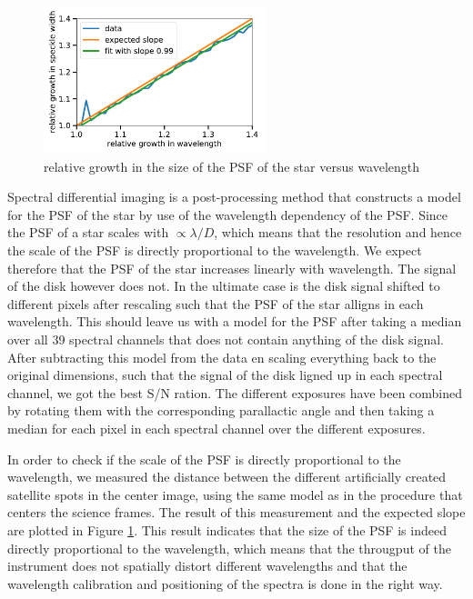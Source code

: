 \documentclass[twoside,single]{lion-msc}
\begin{document}
\begin{figure}
\centering
\includegraphics[width = 0.57\textwidth]{specklegrowth}
\caption{relative growth in the size of the PSF of the star versus wavelength}
\label{fig:specklegrowth}
\end{figure}
Spectral differential imaging is a post-processing method that constructs a model for the PSF of the star by use of the wavelength dependency of the PSF. Since the PSF of a star scales with $ \propto\lambda/D$, which means that the resolution and hence the scale of the PSF is directly proportional to the wavelength. We expect therefore that the PSF of the star increases linearly with wavelength. The signal of the disk however does not. In the ultimate case is the disk signal shifted to different pixels after rescaling such that the PSF of the star alligns in each wavelength. This should leave us with a model for the PSF after taking a median over all 39 spectral channels that does not contain anything of the disk signal. After subtracting this model from the data en scaling everything back to the original dimensions, such that the signal of the disk ligned up in each spectral channel, we got the best S/N ration. The different exposures have been combined by rotating them with the corresponding parallactic angle and then taking a median for each pixel in each spectral channel over the different exposures.
\bigskip

In order to check if the scale of the PSF is directly proportional to the wavelength, we measured the distance between the different artificially created satellite spots in the center image, using the same model as in the procedure that centers the science frames. The result of this measurement and the expected slope are plotted in Figure \ref{fig:specklegrowth}. This result indicates that the size of the PSF is indeed directly proportional to the wavelength, which means that the througput of the instrument does not spatially distort different wavelengths and that the wavelength calibration and positioning of the spectra is done in the right way.
\bigskip
\end{document}
